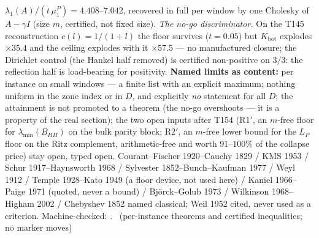\documentclass[11pt,a4paper]{article}
\theoremstyle{definition}
\begin{document}
$\lambda_1(A)/(t\,\mu^P_1)=4.408$--$7.042$, recovered in full per window
by one Cholesky of $A-\gamma I$ (size $m$, certified, not fixed size).
\emph{The no-go discriminator.} On the T145 reconstruction
$c(l)=1/(1+l)$ the floor survives ($t=0.05$) but $K_{\mathrm{bot}}$
explodes $\times35.4$ and the ceiling explodes with it $\times57.5$ ---
no manufactured closure; the Dirichlet control (the Hankel half removed)
is certified non-positive on $3/3$: the reflection half is load-bearing
for positivity.
\textbf{Named limits as content:} per instance on small windows --- a
finite list with an explicit maximum; nothing uniform in the zone index
or in $D$, and explicitly \emph{no} statement for all $D$; the attainment
is not promoted to a theorem (the no-go overshoots --- it is a property
of the real section); the two open inputs after T154 (R1$'$, an $m$-free
floor for $\lambda_{\min}(B_{HH})$ on the bulk parity block; R2$'$, an
$m$-free lower bound for the $L_P$ floor on the Ritz complement,
arithmetic-free and worth $91$--$100\%$ of the collapse price) stay open,
typed open.
Courant--Fischer 1920--Cauchy 1829 / KMS 1953 / Schur 1917--Haynsworth
1968 / Sylvester 1852--Bunch--Kaufman 1977 / Weyl 1912 / Temple
1928--Kato 1949 (a floor device, not used here) / Kaniel 1966--Paige 1971
(quoted, never a bound) / Bj\"orck--Golub 1973 / Wilkinson 1968--Higham
2002 / Chebyshev 1852 named classical; Weil 1952 cited, never used as a
criterion.
Machine-checked:
.
\mE\ (per-instance theorems and certified inequalities; no marker moves)
\end{document}
